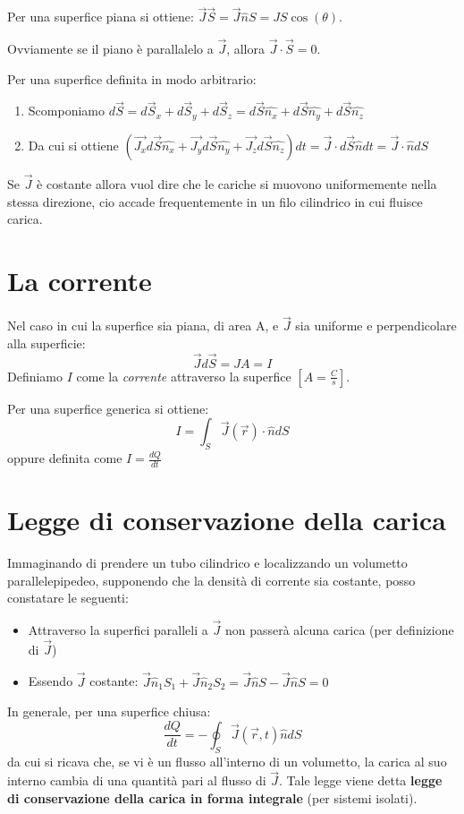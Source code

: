 \documentclass{book}
\begin{document}
Per una superfice piana si ottiene: $\vec{J} \vec{S} = \vec{J} \hat{n} S = JS \cos(\theta)$.

Ovviamente se il piano è parallalelo a $\vec{J}$, allora $\vec{J} \cdot \vec{S} = 0$.

Per una superfice definita in modo arbitrario:
\begin{enumerate}
  \item Scomponiamo $d\vec{S}=d\vec{S}_x + d\vec{S}_y + d\vec{S}_z =  d\vec{S}\hat{n_x} + d\vec{S} \hat{n_y} + d\vec{S} \hat{n_z}$
  \item Da cui si ottiene $\left(\vec{J_x}d\vec{S}\hat{n_x} + \vec{J_y}d\vec{S}\hat{n_y} + \vec{J_z}d\vec{S}\hat{n_z}\right) dt = \vec{J} \cdot d\vec{S} \hat{n}dt = \vec{J} \cdot \hat{n} dS$   
\end{enumerate}


Se $\vec{J}$ è costante allora vuol dire che le cariche si muovono uniformemente nella stessa direzione, cio accade frequentemente
in un filo cilindrico in cui fluisce carica.



\section{La corrente}
Nel caso in cui la superfice sia piana, di area A, e $\vec{J}$ sia uniforme e perpendicolare alla superficie: 
\[
\vec{J}d\vec{S}=JA=I
\]
Definiamo $I$ come la \emph{corrente} attraverso la superfice $\left[A=\frac{C}{s}\right]$.

Per una superfice generica si ottiene:
\[
I = \int_S \vec{J}(\vec{r}) \cdot \hat{n}d{S} 
\]
oppure definita come $I=\frac{dQ}{dt}$


\section{Legge di conservazione della carica}
Immaginando di prendere un tubo cilindrico e localizzando un volumetto parallelepipedeo, supponendo che la densità di corrente sia costante,
posso constatare le seguenti:
\begin{itemize}
  \item Attraverso la superfici paralleli a $\vec{J}$ non passerà alcuna carica (per definizione di $\vec{J}$)
  \item Essendo $\vec{J}$ costante: $\vec{J} \hat{n}_1 S_1 + \vec{J} \hat{n}_2 S_2 = \vec{J} \hat{n} S - \vec{J} \hat{n} S = 0 $
\end{itemize}
In generale, per una superfice chiusa:
\[
\frac{dQ}{dt}=-\oint_S \vec{J}(\vec{r}, t)\hat{n}dS
\]
da cui si ricava che, se vi è un flusso all'interno di un volumetto, la carica al suo interno cambia di una quantità pari al flusso di $\vec{J}$.
Tale legge viene detta \textbf{legge di conservazione della carica in forma integrale} (per sistemi isolati).
\end{document}
